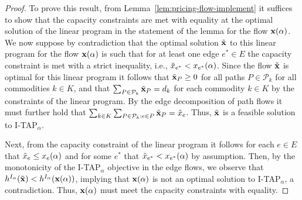 \documentclass{article}
\newif\ifarxiv   %
\begin{document}
\else
\begin{proof}
To prove this result, from Lemma~\ref{lem:pricing-flow-implement} it suffices to show that the capacity constraints are met with equality at the optimal solution of the linear program in the statement of the lemma for the flow $\x(\alpha)$. We now suppose by contradiction that the optimal solution $\Tilde{\x}$ to this linear program for the flow $\x(\alpha)$ is such that for at least one edge $e^*\in E$ the capacity constraint is met with a strict inequality, i.e., $\Tilde{x}_{e^*}<x_{e^*}(\alpha)$. Since the flow $\Tilde{\x}$ is optimal for this linear program it follows that $\Tilde{\x}_{P} \geq 0$ for all paths $P \in \mathcal{P}_k$ for all commodities $k \in K$, and that $\sum_{P \in \mathcal{P}_k} \Tilde{\x}_{P} = d_k$ for each commodity $k \in K$ by the constraints of the linear program. \ifarxiv Note here that the demand constraints satisfy $\sum_{P \in \mathcal{P}_k} \Tilde{\x}_{P} = d_k$ and the non-negativity constraints $\Tilde{\x}_{P} \geq 0$ imply that the corresponding demand and non-negativity constraints for I-TAP$_{\alpha}$ are also satisfied for the flow $\Tilde{\x}$. \fi 
By the edge decomposition of path flows it must further hold that $\sum_{k \in K} \sum_{P \in \mathcal{P}_k: e \in P} \Tilde{\mathbf{x}}_{P} = \Tilde{x}_e$. Thus, \ifarxiv we observe that the flow \fi $\Tilde{\x}$ is a feasible solution to I-TAP$_{\alpha}$. 

Next, from the capacity constraint of the linear program it follows for each $e \in E$ that $\Tilde{x}_e \leq x_e(\alpha)$ and for \ifarxiv at least one edge \else some \fi $e^*$ that $\Tilde{x}_{e^*}<x_{e^*}(\alpha)$ by assumption. Then, by the monotonicity of the I-TAP$_{\alpha}$ objective in the edge flows, we observe that $h^{I_{\alpha}}(\Tilde{\mathbf{x}}) < h^{I_{\alpha}}(\mathbf{x}(\alpha))$, implying that $\x(\alpha)$ is not an optimal solution to I-TAP$_{\alpha}$, a contradiction. \ifarxiv Thus, the flow $\Tilde{\x}$ cannot exist, proving our claim that any optimal solution to the linear program for the flow $\x(\alpha)$ must meet the capacity constraint with equality. \else Thus, $\x(\alpha)$ must meet the capacity constraints with equality. \fi
\end{proof}
\fi
\end{document}
